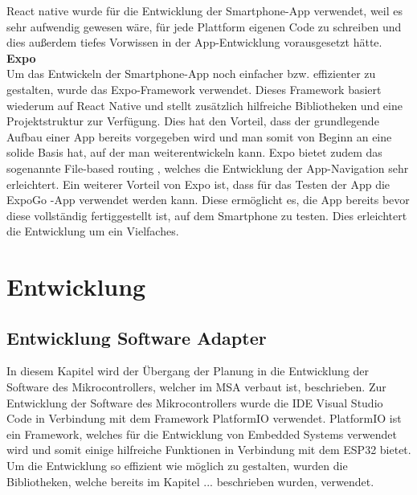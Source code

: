 \documentclass[11pt, twoside]{article}
\begin{document}
React native wurde für die Entwicklung der Smartphone-App verwendet, weil es sehr aufwendig gewesen wäre, für jede Plattform eigenen Code zu schreiben und dies außerdem tiefes Vorwissen in der App-Entwicklung vorausgesetzt hätte. \parencite[vgl.][]{noauthor_urlpi07_nodate}
\vspace{4mm}\newline
\textbf{Expo} \\
Um das Entwickeln der Smartphone-App noch einfacher bzw. effizienter zu gestalten, wurde das Expo-Framework verwendet. Dieses Framework basiert wiederum auf React Native und stellt zusätzlich hilfreiche Bibliotheken und eine Projektstruktur zur Verfügung. Dies hat den Vorteil, dass der grundlegende Aufbau einer App bereits vorgegeben wird und man somit von Beginn an eine solide Basis hat, auf der man weiterentwickeln kann. Expo bietet zudem das sogenannte \glqq File-based routing \grqq{}, welches die Entwicklung der App-Navigation sehr erleichtert. Ein weiterer Vorteil von Expo ist, dass für das Testen der App die \glqq ExpoGo \grqq{} -App verwendet werden kann. Diese ermöglicht es, die App bereits bevor diese vollständig fertiggestellt ist, auf dem Smartphone zu testen. Dies erleichtert die Entwicklung um ein Vielfaches. \parencite[vgl.][]{noauthor_urlpi08_nodate}
\section{Entwicklung}
\subsection{Entwicklung Software Adapter}
In diesem Kapitel wird der Übergang der Planung in die Entwicklung der Software des Mikrocontrollers, welcher im MSA verbaut ist, beschrieben. 
Zur Entwicklung der Software des Mikrocontrollers wurde die IDE Visual Studio Code in Verbindung mit dem Framework PlatformIO verwendet. PlatformIO ist ein Framework, welches für die Entwicklung von Embedded Systems verwendet wird und somit einige hilfreiche Funktionen in Verbindung mit dem ESP32 bietet. \parencite[vgl.][]{noauthor_urlpi26_nodate} Um die Entwicklung so effizient wie möglich zu gestalten, wurden die Bibliotheken, welche bereits im Kapitel ... beschrieben wurden, verwendet.
\end{document}
